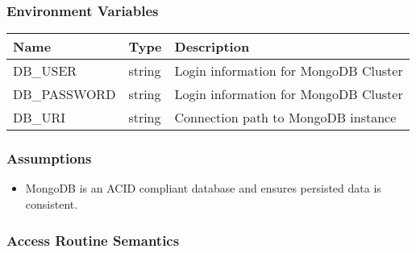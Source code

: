 \documentclass[12pt, titlepage]{article}
\begin{document}
\subsubsection{Environment Variables}

\begin{center}

\begin{tabular}{|p{5cm} |p{5cm} |p{5cm}|}
\hline
\textbf{Name} & \textbf{Type} & \textbf{Description} \\
\hline
DB\_USER & string & Login information for MongoDB Cluster \\
\hline
DB\_PASSWORD & string & Login information for MongoDB Cluster \\
\hline
DB\_URI & string & Connection path to MongoDB instance \\
\hline
\end{tabular}
\end{center}

\subsubsection{Assumptions}

\begin{itemize}
    \item MongoDB is an ACID compliant database and ensures persisted data is consistent.
\end{itemize}

\subsubsection{Access Routine Semantics}
\end{document}
